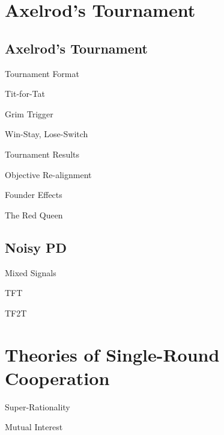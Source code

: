 \documentclass[pdf]{beamer}
\begin{document}
\section{Axelrod's Tournament}
\subsection{Axelrod's Tournament}
\begin{frame}{Tournament Format}
\end{frame}
\begin{frame}{Tit-for-Tat}
\end{frame}
\begin{frame}{Grim Trigger}
\end{frame}
\begin{frame}{Win-Stay, Lose-Switch}
\end{frame}
\begin{frame}{Tournament Results}
\end{frame}
\begin{frame}{Objective Re-alignment}
\end{frame}
\begin{frame}{Founder Effects}
\end{frame}
\begin{frame}{The Red Queen}
\end{frame}

\subsection{Noisy PD}
\begin{frame}{Mixed Signals}
\end{frame}
\begin{frame}{TFT}
\end{frame}
\begin{frame}{TF2T}
\end{frame}

\section{Theories of Single-Round Cooperation}
\begin{frame}{Super-Rationality}
\end{frame}

\begin{frame}{Mutual Interest}
\end{frame}
\end{document}
